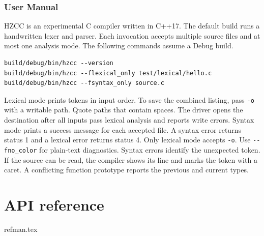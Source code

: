 \documentclass{report}
\newcommand{\+}{}
\begin{document}
    \section{User Manual}\label{sec:user-manual}
    HZCC is an experimental C compiler written in C++17. The default build runs
    a handwritten lexer and parser. Each invocation accepts multiple source files
    and at most one analysis mode. The following commands assume a Debug build.

    \begin{verbatim}
build/debug/bin/hzcc --version
build/debug/bin/hzcc --flexical_only test/lexical/hello.c
build/debug/bin/hzcc --fsyntax_only source.c
    \end{verbatim}

    Lexical mode prints tokens in input order. To save the combined listing, pass
    \verb|-o| with a writable path. Quote paths that contain spaces. The driver
    opens the destination after all inputs pass lexical analysis and reports
    write errors. Syntax mode prints a success message for each accepted file.
    A syntax error returns status 1 and a lexical error returns status 4.
    Only lexical mode accepts \verb|-o|. Use \verb|--fno_color| for plain-text
    diagnostics. Syntax errors identify the unexpected token. If the source can
    be read, the compiler shows its line and marks the token with a caret. A
    conflicting function prototype reports the previous and current types.

    \clearpage
    \appendix


    \part*{API reference}
    {refman.tex}

    \printindex
\end{document}
